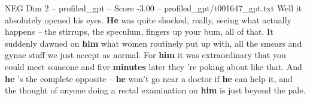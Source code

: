 \begin{textsample}{NEG Dim 2 – profiled\_gpt – Score -3.00 – profiled\_gpt/t001647\_gpt.txt}  \label{ex:f2_neg_032}
Well it absolutely opened his eyes. \textbf{He} was quite shocked, really, seeing what actually happens – the stirrups, the speculum, fingers up your bum, all of that.
It suddenly dawned on \textbf{him} what women routinely put up with, all the smears and gynae stuff we just accept as normal.
For \textbf{him} it was extraordinary that you could meet someone and five \textbf{minutes} later they ’re poking about like that.
And \textbf{he} ’s the complete opposite – \textbf{he} won't go near a doctor if \textbf{he} can help it, and the thought of anyone doing a rectal examination on \textbf{him} is just beyond the pale.

\end{textsample}
